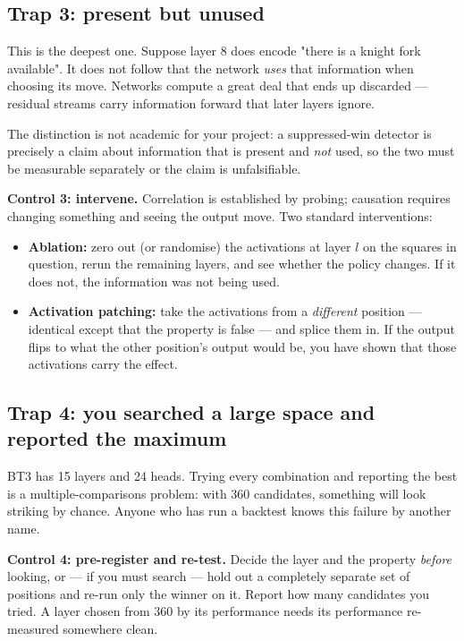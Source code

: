 \subsection{Trap 3: present but unused}

This is the deepest one. Suppose layer 8 does encode "there is a knight fork available". It
does not follow that the network \emph{uses} that information when choosing its move. Networks
compute a great deal that ends up discarded --- residual streams carry information forward
that later layers ignore.

The distinction is not academic for your project: a suppressed-win detector is precisely a
claim about information that is present and \emph{not} used, so the two must be measurable
separately or the claim is unfalsifiable.

\begin{keyidea}
\textbf{Control 3: intervene.} Correlation is established by probing; causation requires
changing something and seeing the output move. Two standard interventions:
\begin{itemize}
\item \textbf{Ablation:} zero out (or randomise) the activations at layer $l$ on the squares
  in question, rerun the remaining layers, and see whether the policy changes. If it does not,
  the information was not being used.
\item \textbf{Activation patching:} take the activations from a \emph{different} position ---
  identical except that the property is false --- and splice them in. If the output flips to
  what the other position's output would be, you have shown that those activations carry the
  effect.
\end{itemize}
\end{keyidea}

\subsection{Trap 4: you searched a large space and reported the maximum}

BT3 has 15 layers and 24 heads. Trying every combination and reporting the best is a
multiple-comparisons problem: with 360 candidates, something will look striking by chance.
Anyone who has run a backtest knows this failure by another name.

\begin{keyidea}
\textbf{Control 4: pre-register and re-test.} Decide the layer and the property \emph{before}
looking, or --- if you must search --- hold out a completely separate set of positions and
re-run only the winner on it. Report how many candidates you tried. A layer chosen from 360 by
its performance needs its performance re-measured somewhere clean.
\end{keyidea}

